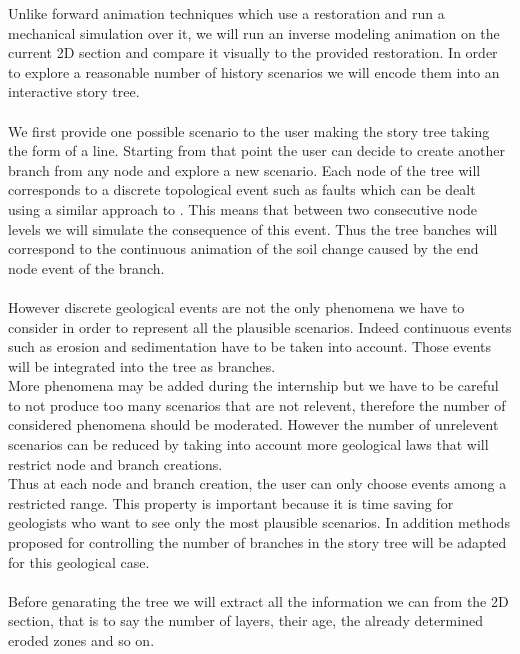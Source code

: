 \documentclass[a4paper,11pt]{article}
\begin{document}
Unlike forward animation techniques which use a restoration and run a mechanical simulation over it, we will run an inverse modeling animation on the current 2D section and compare it visually to the provided restoration. 
In order to explore a reasonable number of history scenarios we will encode them into an interactive story tree.\\\\
We first provide one possible scenario to the user making the story tree taking the form of a line. Starting from that point the user can decide to create another branch from any node and explore a new scenario. 
Each node of the tree will corresponds to a discrete topological event such as faults which can be dealt using a similar approach to \cite{cherpeau}. This means that between two consecutive node levels we will simulate the consequence of this event. Thus the tree banches will correspond to the continuous animation of the soil change caused by the end node event of the branch.  \\\\
However discrete geological events are not the only phenomena we have to consider in order to represent all the plausible scenarios. Indeed continuous events such as erosion and sedimentation have to be taken into account. Those events will be integrated into the tree as branches.\\
More phenomena may be added during the internship but we have to be careful to not produce too many scenarios that are not relevent, therefore the number of considered phenomena should be moderated.
However the number of unrelevent scenarios can be reduced by taking into account more geological laws that will restrict node and branch creations.\\
Thus at each node and branch creation, the user can only choose events among a restricted range. This property is important because it is time saving for geologists who want to see only the most plausible scenarios. In addition methods proposed for controlling the number of branches in the story tree \cite{young} will be adapted for this geological case.\\\\
Before genarating the tree we will extract all the information we can from the 2D section, that is to say the number of layers, their age, the already determined eroded zones and so on.\\\\
\end{document}
